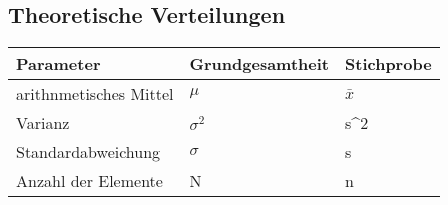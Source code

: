 \subsection{Theoretische Verteilungen}
\begin{table}[ht]
\centering
\begin{tabular}{lll}
\toprule
Parameter & Grundgesamtheit & Stichprobe          \\ \midrule
arithnmetisches Mittel & $\mu$           &     $\bar{x}$                \\
Varianz                & $\sigma^2$      & s\textasciicircum 2 \\
Standardabweichung     & $\sigma$        & s                   \\
Anzahl der Elemente    & N               & n \\ \bottomrule                 
\end{tabular}
\end{table}
